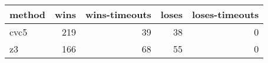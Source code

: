 \begin{tabular}{lrrrr}
\hline
 method   &   wins &   wins-timeouts &   loses &   loses-timeouts \\
\hline
 cvc5     &    219 &              39 &      38 &                0 \\
 z3       &    166 &              68 &      55 &                0 \\
\hline
\end{tabular}
